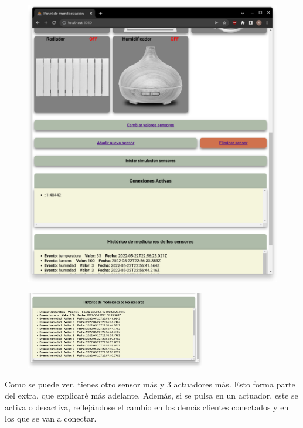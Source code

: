 \documentclass{article}
\begin{document}
\begin{figure}[H]
\begin{minipage}[H]{0.49\textwidth}
        \includegraphics[width=\textwidth]{images/pagina2.png}
    \end{minipage}
\end{figure}

\begin{figure}[H]
    \centering
    \includegraphics[width=0.7\textwidth]{images/pagina3.png}
\end{figure}

Como se puede ver, tienes otro sensor más y 3 actuadores más. Esto forma parte del extra, que explicaré más adelante. Además, si se pulsa en un actuador, este se activa o desactiva, reflejándose el cambio en los demás clientes conectados y en los que se van a conectar.
\end{document}
